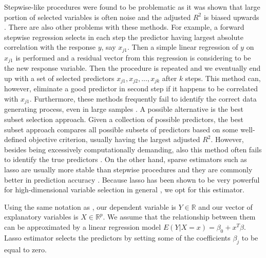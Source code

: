 \documentclass[a4paper,12pt]{article}
\begin{document}
Stepwise-like procedures were found to be problematic as it was shown that large portion of selected variables is often noise and the adjusted $R^2$ is biased upwards \citep{Flack1987}. There are also other problems with these methods. For example, a forward stepwise regression selects in each step the predictor having largest absolute correlation with the response $y$, say $x_{j1}$. Then a simple linear regression of $y$ on $x_{j1}$ is performed and a residual vector from this regression is considering to be the new response variable. Then the procedure is repeated and we eventually end up with a set of selected predictors $x_{j1}, x_{j2},...,x_{jk}$ after $k$ steps. This method can, however, eliminate a good predictor in second step if it happens to be correlated with $x_{j1}$.  Furthermore, these methods frequently fail to identify the correct data generating process, even in large samples \citep{Austin2008}. A possible alternative is the best subset selection approach. Given a collection of possible predictors, the best subset approach compares all possible subsets of predictors based on some well-defined objective criterion, usually having the largest adjusted $R^2$. However, besides being excessively computationally demanding, also this method often fails to identify the true predictors \citep{Flack1987}. On the other hand, sparse estimators such as lasso \citep{tibshirani96} are usually more stable than stepwise procedures and they are commonly better in prediction accuracy \citep{statisHighDimData}. Because lasso has been shown to be very powerful for high-dimensional variable selection in general \citep{pValsLasso}, we opt for this estimator. 

Using the same notation as \citet{Friedman2010}, our dependent variable is $Y \in \mathbb{R}$ and our vector of explanatory variables is $X \in \mathbb{R}^p$. We assume that the relationship between them can be approximated by a linear regression model $E(Y|X=x) = \beta_0+x^T\beta$. Lasso estimator selects the predictors by setting some of the coefficients $\beta_j$ to be equal to zero.
\end{document}
